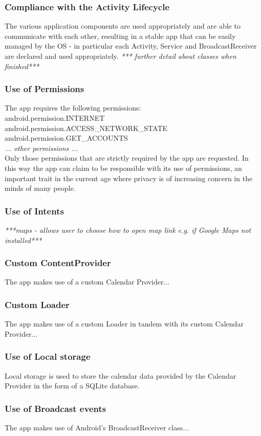 \documentclass{article}
\begin{document}
\subsubsection{Compliance with the Activity Lifecycle}
The various application components are used appropriately and are able to communicate with each other, resulting in a stable app that can be easily managed by the OS - in particular each Activity, Service and BroadcastReceiver are declared and used appropriately. \emph{*** further detail about classes when finished*** }
\subsubsection{Use of Permissions}
The app requires the following permissions:\\
    \indent android.permission.INTERNET\\
    \indent android.permission.ACCESS_NETWORK_STATE\\
    \indent android.permission.GET_ACCOUNTS\\
    \indent \emph{... other permissions ...}\\
Only those permissions that are strictly required by the app are requested. In this way the app can claim to be responsible with its use of permissions, an important trait in the current age where privacy is of increasing concern in the minds of many people. 

\subsubsection{Use of Intents}
\emph{***maps - allows user to choose how to open map link e.g. if Google Maps not installed***}
\subsubsection{Custom ContentProvider}
The app makes use of a custom Calendar Provider...
\subsubsection{Custom Loader}
The app makes use of a custom Loader in tandem with its custom Calendar Provider...
\subsubsection{Use of Local storage}
Local storage is used to store the calendar data provided by the Calendar Provider in the form of a SQLite database.
\subsubsection{Use of Broadcast events}
The app makes use of Android's BroadcastReceiver class...
\end{document}
